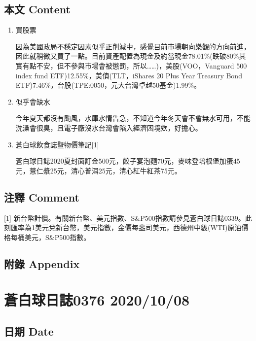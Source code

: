 \documentclass[
]{article}
\begin{document}
\hypertarget{ux672cux6587-content-6}{%
\subsection{本文 Content}\label{ux672cux6587-content-6}}

\begin{enumerate}
\def\labelenumi{\arabic{enumi}.}
\item
  買股票

  因為美國政局不穩定因素似乎正削減中，感覺目前市場朝向樂觀的方向前進，因此就稍微又買了一點。目前資產配置為現金及約當現金78.01\%(跌破80\%其實有點不安，但不參與市場會被懲罰，所以\ldots\ldots)，美股(VOO，Vanguard
  500 index fund ETF)12.55\%，美債(TLT，iShares 20 Plus Year Treasury
  Bond ETF)7.46\%，台股(TPE:0050，元大台灣卓越50基金)1.99\%。
\item
  似乎會缺水

  今年夏天都沒有颱風，水庫水情告急，不知道今年冬天會不會無水可用，不能洗澡會很臭，且電子廠沒水台灣會陷入經濟困境欸，好擔心。
\item
  蒼白球飲食誌暨物價筆記{[}1{]}

  蒼白球日誌2020夏封面訂金500元，餃子宴泡麵70元，麥味登培根堡加蛋45元，薏仁漿25元，清心普洱25元，清心紅牛紅茶75元。
\end{enumerate}

\hypertarget{ux6ce8ux91cb-comment-6}{%
\subsection{注釋 Comment}\label{ux6ce8ux91cb-comment-6}}

{[}1{]}
新台幣計價。有關新台幣、美元指數、S\&P500指數請參見蒼白球日誌0339。此刻匯率為1美元兌新台幣，美元指數，金價每盎司美元，西德州中級(WTI)原油價格每桶美元，S\&P500指數。

\hypertarget{ux9644ux9304-appendix-6}{%
\subsection{附錄 Appendix}\label{ux9644ux9304-appendix-6}}

\hypertarget{ux84bcux767dux7403ux65e5ux8a8c0376-20201008}{%
\section{蒼白球日誌0376
2020/10/08}\label{ux84bcux767dux7403ux65e5ux8a8c0376-20201008}}

\hypertarget{ux65e5ux671f-date-7}{%
\subsection{日期 Date}\label{ux65e5ux671f-date-7}}
\end{document}
